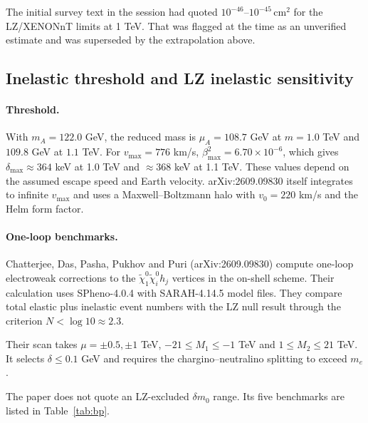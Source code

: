 \documentclass[11pt,a4paper]{article}
\begin{document}
The initial survey text in the session had quoted $10^{-46}$--$10^{-45}\,\mathrm{cm^2}$ for the LZ/XENONnT limits at 1 TeV. That was flagged at the time as an unverified estimate and was superseded by the extrapolation above.

\subsection{Inelastic threshold and LZ inelastic sensitivity}

\paragraph{Threshold.} With $m_A = 122.0$ GeV, the reduced mass is $\mu_A = 108.7$ GeV at $m = 1.0$ TeV and $109.8$ GeV at $1.1$ TeV. For $v_{\max} = 776$ km/s, $\beta_{\max}^2 = 6.70\times10^{-6}$, which gives $\delta_{\max} \approx 364$ keV at 1.0 TeV and $\approx 368$ keV at 1.1 TeV. These values depend on the assumed escape speed and Earth velocity. arXiv:2609.09830 itself integrates to infinite $v_{\max}$ and uses a Maxwell--Boltzmann halo with $v_0 = 220$ km/s and the Helm form factor.

\paragraph{One-loop benchmarks.} Chatterjee, Das, Pasha, Pukhov and Puri (arXiv:2609.09830) compute one-loop electroweak corrections to the $\tilde\chi^0_1\tilde\chi^0_i h_j$ vertices in the on-shell scheme. Their calculation uses SPheno-4.0.4 with SARAH-4.14.5 model files. They compare total elastic plus inelastic event numbers with the LZ null result through the criterion $N < \log 10 \approx 2.3$.

Their scan takes $\mu = \pm0.5, \pm1$ TeV, $-21\le M_1\le -1$ TeV and $1\le M_2 \le 21$ TeV. It selects $\delta\le 0.1$ GeV and requires the chargino--neutralino splitting to exceed $m_e$.

The paper does not quote an LZ-excluded $\delta m_0$ range. Its five benchmarks are listed in Table~\ref{tab:bp}.
\end{document}
